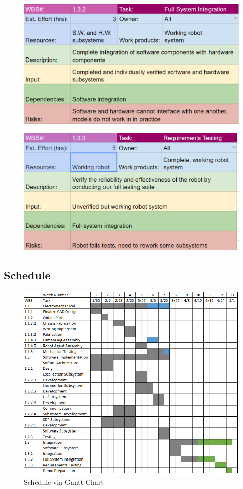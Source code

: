 \begin{figure}[h!]
\centering
\includegraphics[width=0.98\columnwidth]{wbs_schedule/wbs_dict_int2.PNG}
\label{fig:int1}
\end{figure}
\begin{figure}[h!]
\centering
\includegraphics[width=0.98\columnwidth]{wbs_schedule/wbs_dict_int3.PNG}
\label{fig:int1}
\end{figure}

\clearpage

\subsection{Schedule}
\label{sec:schedule}


\begin{figure}[h!]
\centering
\includegraphics[width=0.6\columnwidth]{figs/gantt_chart_4_3_17.png}
\caption{Schedule via Gantt Chart}
\label{fig:gantt_4_3}
\end{figure}
